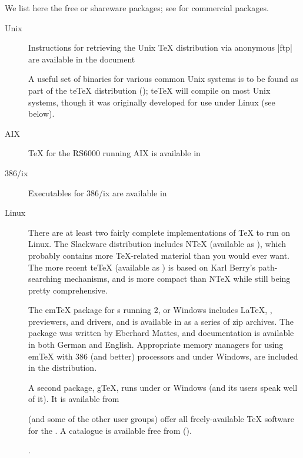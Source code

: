 We list here the free or shareware packages; see
 for commercial packages.
\begin{description}
\item[Unix] Instructions for retrieving the Unix \TeX{} distribution
  via anonymous |ftp| are available in the document

  A useful set of binaries for various common Unix systems is
  to be found as part of the te\TeX{} distribution
  (); te\TeX{} will compile on most Unix systems,
  though it was originally developed for use under Linux (see below).

\item[AIX] \TeX{} for the  RS6000 running AIX is available in

\item[386/ix] Executables for 386/ix are available in

\item[Linux] There are at least two fairly complete implementations of
  \TeX{} to run on Linux.  The Slackware distribution includes N\TeX{}
  (available as ), which probably contains more
  \TeX{}-related material than you would ever want.  The more recent
  te\TeX{} (available as ) is based on Karl Berry's
  path-searching mechanisms, and is more compact than N\TeX{} while
  still being pretty comprehensive.

\item[] The em\TeX{} package for s running 2, \MSDOS{} or Windows
  includes \LaTeX{}, \BibTeX{}, previewers, and drivers, and is
  available in  as a series of zip archives.  The
  package was written by Eberhard Mattes, and documentation is
  available in both German and English.  Appropriate memory managers
  for using em\TeX{} with 386 (and better) processors and under
  Windows, are included in the distribution.

  A second package, g\TeX{}, runs under \MSDOS{} or Windows (and its
  users speak well of it).  It is available from 

   (and some of the other user groups) offer all freely-available
  \TeX{} software for the .  A catalogue is available free from
\htmlignore
   ().
\endhtmlignore
\begin{htmlversion}
  .
\end{htmlversion}


\end{description}
